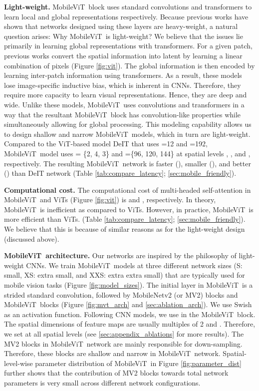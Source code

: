 \documentclass[preprint]{article} \usepackage{iclr2022_conference,times}
\newcommand{\arch}{MobileViT}
\providecommand{\sachin}[1]{{\protect\color{black}{#1}}}
\begin{document}
\textbf{Light-weight.} \arch~block uses standard convolutions and transformers to learn local and global representations respectively. Because previous works \citep[e.g.,][]{howard2017mobilenets, mehta2021delight} have shown that networks designed using these layers are heavy-weight, a natural question arises: Why \arch~is light-weight? We believe that the issues lie primarily in learning global representations with transformers. For a given patch, previous works \citep[e.g.,][]{touvron2021training, graham2021levit} convert the spatial information into latent by learning a linear combination of pixels (Figure \ref{fig:vit}). The global information is then encoded by learning inter-patch information using transformers. As a result, these models lose image-specific inductive bias, which is inherent in CNNs. Therefore, they require more capacity to learn visual representations. Hence, they are deep and wide. Unlike these models, \arch~uses convolutions and transformers in a way that the resultant \arch~block has convolution-like properties while simultaneously allowing for global processing. This modeling capability allows us to design shallow and narrow \arch~models, which in turn are light-weight. Compared to the ViT-based model DeIT that uses =12 and =192,  \arch~model uses = \{2, 4, 3\} and =\{96, 120, 144\} at spatial levels , , and , respectively. The resulting \arch~network is faster (), smaller (), and better () than DeIT network (Table \ref{tab:compare_latency}; \textsection \ref{sec:mobile_friendly}).

\textbf{Computational cost.} The computational cost of multi-headed self-attention in \arch~and ViTs (Figure \ref{fig:vit}) is  and , respectively. In theory, \arch~is inefficient as compared to ViTs. However, in practice, \arch~is more efficient than ViTs. \sachin{\arch~has  fewer FLOPs and delivers  better accuracy than DeIT on the ImageNet-1K dataset} (Table \ref{tab:compare_latency}; \textsection \ref{sec:mobile_friendly}). We believe that this is because of similar reasons as for the light-weight design (discussed above).

\textbf{\arch~architecture.} Our networks are inspired by the philosophy of light-weight CNNs. We train \arch~models at three different network sizes (S: small, XS: extra small, and XXS: extra extra small) that are typically used for mobile vision tasks (Figure \ref{fig:model_sizes}). The initial layer in \arch~is a strided  standard convolution, followed by MobileNetv2 (or MV2) blocks and \arch~blocks (Figure \ref{fig:mvt_arch} and \textsection \ref{sec:ablation_arch}). We use Swish \citep{elfwing2018sigmoid} as an activation function. Following CNN models, we use  in the \arch~block. The spatial dimensions of feature maps are usually multiples of 2 and . Therefore, we set  at all spatial levels (see \textsection \ref{sec:appendix_ablations} for more results). The MV2 blocks in \arch~network are mainly responsible for down-sampling. Therefore, these blocks are shallow and narrow in \arch~network. Spatial-level-wise parameter distribution of \arch~in Figure \ref{fig:parameter_dist} further shows that the contribution of MV2 blocks towards total network parameters is very small across different network configurations.
\end{document}
